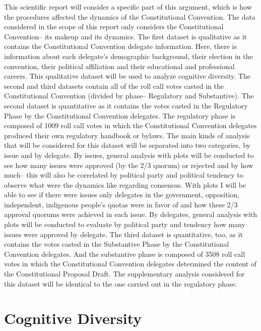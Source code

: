 \documentclass[
  man]{apa6}
\begin{document}
This scientific report will consider a specific part of this argument, which is how the procedures affected the dynamics of the Constitutional Convention. The data considered in the scope of this report only considers the Constitutional Convention-- its makeup and its dynamics.
The first dataset is qualitative as it contains the Constitutional Convention delegate information. Here, there is information about each delegate's demographic background, their election in the convention, their political affiliation and their educational and professional careers. This qualitative dataset will be used to analyze cognitive diversity.
The second and third datasets contain all of the roll call votes casted in the Constitutional Convention (divided by phase-- Regulatory and Substantive). The second dataset is quantitative as it contains the votes casted in the Regulatory Phase by the Constitutional Convention delegates. The regulatory phase is composed of 1009 roll call votes in which the Constitutional Convention delegates produced their own regulatory handbook or bylaws. The main kinds of analysis that will be considered for this dataset will be separated into two categories, by issue and by delegate. By issues, general analysis with plots will be conducted to see how many issues were approved (by the 2/3 quorum) or rejected and by how much-- this will also be correlated by political party and political tendency to observe what were the dynamics like regarding consensus. With plots I will be able to see if there were issues only delegates in the government, opposition, independent, indigenous people's quotas were in favor of and how these 2/3 approval quorums were achieved in each issue. By delegates, general analysis with plots will be conducted to evaluate by political party and tendency how many issues were approved by delegate.
The third dataset is quantitative, too, as it contains the votes casted in the Substantive Phase by the Constitutional Convention delegates. And the substantive phase is composed of 3508 roll call votes in which the Constitutional Convention delegates determined the content of the Constitutional Proposal Draft. The supplementary analysis considered for this dataset will be identical to the one carried out in the regulatory phase.

\hypertarget{cognitive-diversity}{%
\section{Cognitive Diversity}\label{cognitive-diversity}}
\end{document}
